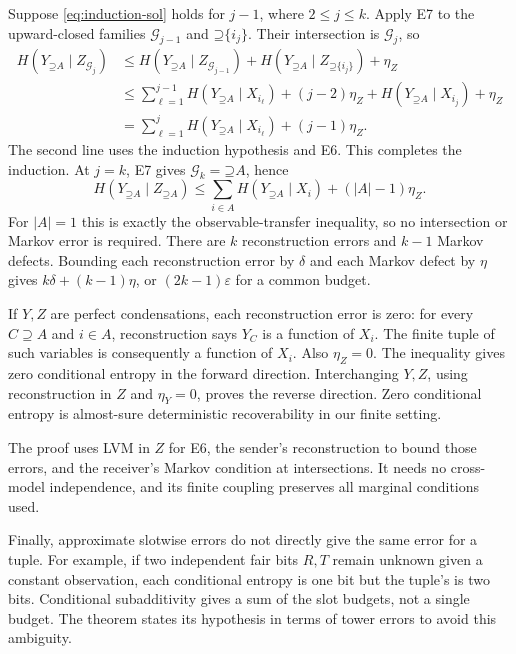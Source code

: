 \documentclass[11pt]{article}
\newcommand{\Up}{\mathord{\supseteq}}
\begin{document}
Suppose \eqref{eq:induction-sol} holds for $j-1$, where $2\le j\le k$.
Apply E7 to the upward-closed families $\mathcal{G}_{j-1}$ and
$\Up\{i_j\}$. Their intersection is $\mathcal{G}_j$, so
\begin{align*}
 H(Y_{\Up A}\mid Z_{\mathcal{G}_j})
 &\le H(Y_{\Up A}\mid Z_{\mathcal{G}_{j-1}})
       +H(Y_{\Up A}\mid Z_{\Up\{i_j\}})+\eta_Z\\
 &\le \sum_{\ell=1}^{j-1}H(Y_{\Up A}\mid X_{i_\ell})+(j-2)\eta_Z
       +H(Y_{\Up A}\mid X_{i_j})+\eta_Z\\
 &=\sum_{\ell=1}^{j}H(Y_{\Up A}\mid X_{i_\ell})+(j-1)\eta_Z.
\end{align*}
The second line uses the induction hypothesis and E6. This completes the
induction. At $j=k$, E7 gives $\mathcal{G}_k=\Up A$, hence
\[
 H(Y_{\Up A}\mid Z_{\Up A})
 \le\sum_{i\in A}H(Y_{\Up A}\mid X_i)+(|A|-1)\eta_Z.
\]
For $|A|=1$ this is exactly the observable-transfer inequality, so no intersection
or Markov error is required. There are $k$ reconstruction errors and $k-1$
Markov defects.
Bounding each reconstruction error by $\delta$ and each Markov defect by
$\eta$ gives
$k\delta+(k-1)\eta$, or $(2k-1)\varepsilon$ for a common budget.

If $Y,Z$ are perfect condensations, each reconstruction error is zero: for every
$C\supseteq A$ and $i\in A$, reconstruction says $Y_C$ is a function
of $X_i$. The finite tuple of such variables is consequently a function of
$X_i$. Also $\eta_Z=0$. The inequality gives zero conditional entropy in the
forward direction. Interchanging $Y,Z$, using reconstruction in $Z$
and $\eta_Y=0$, proves the reverse direction. Zero conditional entropy is
almost-sure deterministic recoverability in our finite setting.

The proof uses LVM in $Z$ for E6, the sender's reconstruction to bound those errors, and the receiver's Markov condition
at intersections. It needs no cross-model independence, and its finite
coupling preserves all marginal conditions used.

Finally, approximate slotwise errors do not directly give the same error for
a tuple. For example, if two independent fair bits $R,T$ remain unknown given
a constant observation, each conditional entropy is one bit but the tuple's
is two bits. Conditional subadditivity gives a sum of the slot budgets, not a
single budget. The theorem states its hypothesis in terms of tower errors to
avoid this ambiguity.
\end{document}

